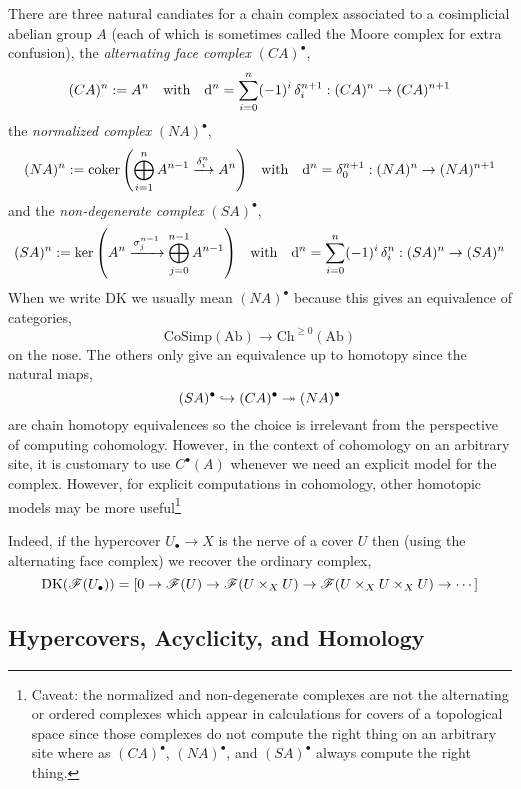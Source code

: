 \documentclass[12pt]{article}
\newcommand{\DK}{\mathrm{DK}}
\renewcommand{\Cech}{\text{\v{C}ech}\xspace}
\begin{document}
\begin{rmk}
There are three natural candiates for a chain complex associated to a cosimplicial abelian group $A$ (each of which is sometimes called the Moore complex for extra confusion), the \textit{alternating face complex} $(C A)^\bullet$,
\[ (C A)^n := A^n \quad \text{with} \quad \mathrm{d}^n = \sum_{i = 0}^n (-1)^i \, \delta^{n+1}_i : (C A)^n \to (C A)^{n+1} \]
the \textit{normalized complex} $(N A)^{\bullet}$,
\[ (N A)^n := \operatorname{\mathrm{coker}}{\left( \bigoplus_{i = 1}^{n} A^{n-1} \xrightarrow{\delta^n_i} A^n \right)} \quad \text{with} \quad \mathrm{d}^n = \delta^{n+1}_0 : (N A)^n \to (N A)^{n+1} \]
and the \textit{non-degenerate complex} $(S A)^{\bullet}$,
\[ (S A)^n := \ker{ \left( A^n \xrightarrow{\sigma^{n-1}_j} \bigoplus_{j = 0}^{n-1} A^{n-1} \right) } \quad \text{with} \quad \mathrm{d}^n = \sum_{i = 0}^n (-1)^i \, \delta^n_i : (S A)^n \to (S A)^n \]
When we write $\DK$ we usually mean $(N A)^\bullet$ because this gives an equivalence of categories,
\[ \mathrm{CoSimp}(\mathrm{Ab}) \to \mathrm{Ch}^{\ge 0}(\mathrm{Ab}) \]
on the nose. The others only give an equivalence up to homotopy since the natural maps,
\[ (S A)^\bullet \hookrightarrow (C A)^\bullet \twoheadrightarrow (N A)^\bullet \]
are chain homotopy equivalences so the choice is irrelevant from the perspective of computing cohomology.
However, in the context of \Cech cohomology on an arbitrary site, it is customary to use $C^\bullet(A)$ whenever we need an explicit model for the complex. However, for explicit computations in \Cech cohomology, other homotopic models may be more useful\footnote{Caveat: the normalized and non-degenerate complexes are not the alternating or ordered complexes which appear in \Cech calculations for covers of a topological space since those complexes do not compute the right thing on an arbitrary site where as $(C A)^\bullet$, $(N A)^\bullet$, and $(S A)^\bullet$ always compute the right thing.}
\end{rmk}

\begin{example}
Indeed, if the hypercover $U_\bullet \to X$ is the \Cech nerve of a cover $U$ then (using the alternating face complex) we recover the ordinary \Cech complex,
\[ \DK(\F(U_\bullet)) = \left[ 0 \to \F(U) \to \F(U \times_X U) \to \F(U \times_X U \times_X U) \to \cdots \right] \]
\end{example}

\subsection{Hypercovers, Acyclicity, and Homology}
\end{document}
